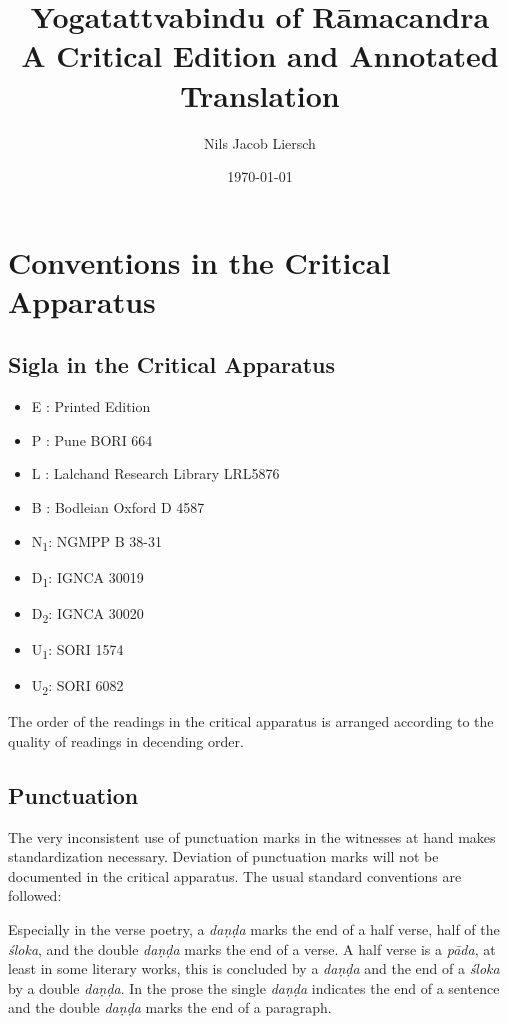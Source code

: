 \documentclass[12pt]{article}%
\author{Nils Jacob Liersch}
\title{Yogatattvabindu of Rāmacandra\\ A Critical Edition and Annotated Translation}
\date{\today}
\def\acpc#1#2#3{{#1}\rlap{\textrm{\textsuperscript{#3}}}\textsubscript{\textrm{#2}}\space}
\def\sigl#1#2{{{#1}}\textsubscript{\textrm{#2}}}
\def\None{{\sigl{N}{1}}} \def\Noneac{\acpc{N}{1}{ac}\,} \def\Nonepc{\acpc{N}{1}{pc}\,}
\def\Done{{\sigl{D}{1}}} \def\Doneac{\acpc{D}{1}{ac}\,} \def\Donepc{\acpc{D}{1}{pc}\,}
\def\Dtwo{{\sigl{D}{2}}} \def\Dtwoac{\acpc{D}{2}{ac}\,} \def\Dtwopc{\acpc{D}{2}{pc}\,}
\def\Uone{{\sigl{U}{1}}} \def\Uoneac{\acpc{U}{1}{ac}\,} \def\Uonepc{\acpc{U}{1}{pc}\,}
\def\Utwo{{\sigl{U}{2}}} \def\Utwoac{\acpc{U}{2}{ac}\,} \def\Utwopc{\acpc{U}{2}{pc}\,}
\begin{document}
\maketitle
\clearpage



\section{Conventions in the Critical Apparatus}
\subsection{Sigla in the Critical Apparatus}

\begin{itemize}
\item E : Printed Edition
\item P : Pune BORI 664
\item L : Lalchand Research Library LRL5876
\item B : Bodleian Oxford D 4587
\item \None : NGMPP B 38-31
\item \Done : IGNCA 30019
\item \Dtwo : IGNCA 30020
\item \Uone : SORI 1574
\item \Utwo: SORI 6082
\end{itemize}

The order of the readings in the critical apparatus is arranged according to the quality of readings in decending order.  

\subsection{Punctuation}

The very inconsistent use of punctuation marks in the witnesses at hand makes standardization necessary. Deviation of punctuation marks will not be documented in the critical apparatus. The usual standard conventions are followed:

Especially in the verse poetry, a \textit{daṇḍa} marks the end of a half verse, half of the \textit{śloka}, and the double \textit{daṇḍa} marks the end of a verse. A half verse is a \textit{pāda}, at least in some literary works, this is concluded by a \textit{daṇḍa} and the end of a \textit{śloka} by a double \textit{daṇḍa}. In the prose the single \textit{daṇḍa} indicates the end of a sentence and the double \textit{daṇḍa} marks the end of a paragraph.
\end{document}

